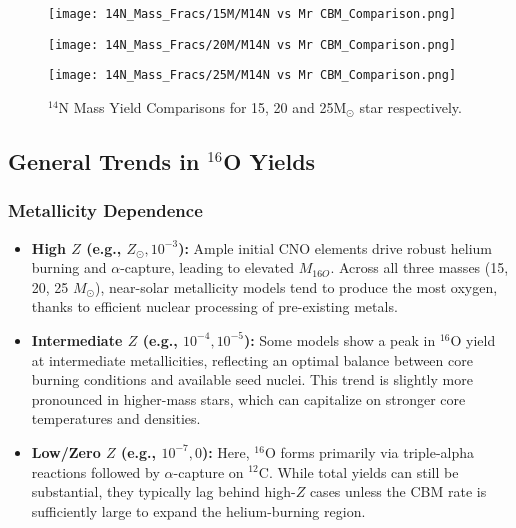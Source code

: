 \begin{figure}
   \centering
   
   \begin{minipage}{0.7\textwidth}
      \centering
      \texttt{[image: 14N\_Mass\_Fracs/15M/M14N vs Mr CBM\_Comparison.png]}
      \label{fig:14N_15M_VCBM}
   \end{minipage}
   
   \begin{minipage}{0.7\textwidth}
      \centering
      \texttt{[image: 14N\_Mass\_Fracs/20M/M14N vs Mr CBM\_Comparison.png]}
      \label{fig:14N_20M_VCBM}
   \end{minipage}
   
   \begin{minipage}{0.7\textwidth}
      \centering
      \texttt{[image: 14N\_Mass\_Fracs/25M/M14N vs Mr CBM\_Comparison.png]}
      \label{fig:14N_25M_VCBM}
   \end{minipage}

   \vspace{-1em}
   \caption{\(^{14}\)N Mass Yield Comparisons for 15, 20 and 25M\(_\odot\) star respectively.}
   \label{fig:20M_yield_comparison}
\end{figure}

\clearpage
\subsection{General Trends in $^{16}$O Yields}

\subsubsection{Metallicity Dependence}
\begin{itemize}
    \item \textbf{High $Z$ (e.g., $Z_\odot, 10^{-3}$):}
    Ample initial CNO elements drive robust helium burning and $\alpha$-capture, leading to elevated $M_{16O}$. Across all three masses (15, 20, 25 $M_\odot$), near-solar metallicity models tend to produce the most oxygen, thanks to efficient nuclear processing of pre-existing metals.

    \item \textbf{Intermediate $Z$ (e.g., $10^{-4}, 10^{-5}$):}
    Some models show a peak in $^{16}$O yield at intermediate metallicities, reflecting an optimal balance between core burning conditions and available seed nuclei. This trend is slightly more pronounced in higher-mass stars, which can capitalize on stronger core temperatures and densities.

    \item \textbf{Low/Zero $Z$ (e.g., $10^{-7}, 0$):}
    Here, $^{16}$O forms primarily via triple-alpha reactions followed by $\alpha$-capture on $^{12}$C. While total yields can still be substantial, they typically lag behind high-$Z$ cases unless the CBM rate is sufficiently large to expand the helium-burning region.
\end{itemize}

